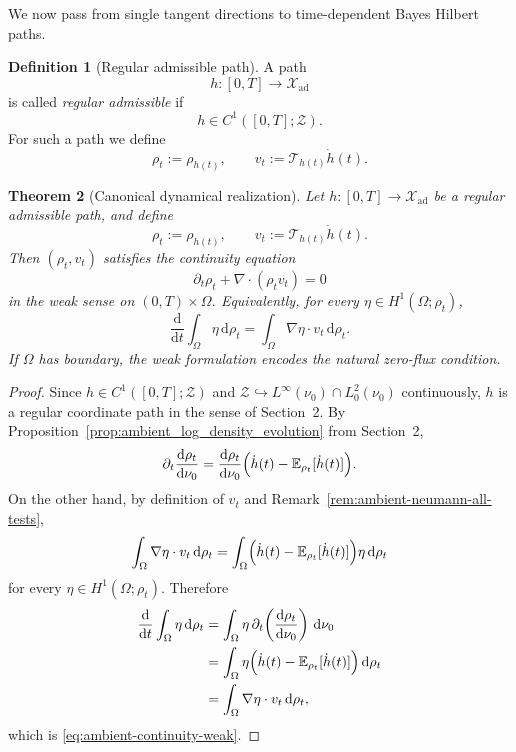 \documentclass{article}
\newtheorem{theorem}{Theorem}[section]
\theoremstyle{definition}
\newtheorem{definition}[theorem]{Definition}
\renewcommand{\d}{\mathrm{d}}
\begin{document}
We now pass from single tangent directions to time-dependent Bayes Hilbert paths.

\begin{definition}[Regular admissible path]
    \label{def:ambient-regular-admissible-path}
    A path
    \[
        h:[0,T]\to \mathcal X_{\mathrm{ad}}
    \]
    is called \emph{regular admissible} if
    \[
        h\in C^1([0,T];\mathcal Z).
    \]
    For such a path we define
    \[
        \rho_t := \rho_{h(t)},
        \qquad
        v_t := \mathcal T_{h(t)}\dot h(t).
    \]
\end{definition}

\begin{theorem}[Canonical dynamical realization]
    \label{thm:ambient-continuity-equation}
    Let \(h:[0,T]\to \mathcal X_{\mathrm{ad}}\) be a regular admissible path, and define
    \[
        \rho_t := \rho_{h(t)},
        \qquad
        v_t := \mathcal T_{h(t)}\dot h(t).
    \]
    Then \((\rho_t,v_t)\) satisfies the continuity equation
    \begin{equation}
        \label{eq:ambient-continuity-equation}
        \partial_t \rho_t + \nabla\cdot(\rho_t v_t)=0
    \end{equation}
    in the weak sense on \((0,T)\times\Omega\). Equivalently, for every
    \(\eta\in H^1(\Omega;\rho_t)\),
    \begin{equation}
        \label{eq:ambient-continuity-weak}
        \frac{\d}{\d t}\int_\Omega \eta\, \d\rho_t
        =
        \int_\Omega \nabla \eta\cdot v_t\, \d\rho_t.
    \end{equation}
    If \(\Omega\) has boundary, the weak formulation encodes the natural zero-flux condition.
\end{theorem}

\begin{proof}
    Since \(h\in C^1([0,T];\mathcal Z)\) and \(\mathcal Z\hookrightarrow L^\infty(\nu_0)\cap
    L^2_0(\nu_0)\) continuously, \(h\) is a regular coordinate path in the sense of Section~2.
    By Proposition~\ref{prop:ambient_log_density_evolution} from Section~2,
    \[
        \partial_t \frac{\d\rho_t}{\d\nu_0}
        =
        \frac{\d\rho_t}{\d\nu_0}
        \Bigl(\dot h(t)-\mathbb E_{\rho_t}[\dot h(t)]\Bigr).
    \]
    On the other hand, by definition of \(v_t\) and
    Remark~\ref{rem:ambient-neumann-all-tests},
    \[
        \int_\Omega \nabla\eta\cdot v_t\,\d\rho_t
        =
        \int_\Omega
        \Bigl(\dot h(t)-\mathbb E_{\rho_t}[\dot h(t)]\Bigr)\eta\,\d\rho_t
    \]
    for every \(\eta\in H^1(\Omega;\rho_t)\). Therefore
    \begin{align*}
        \frac{\d}{\d t}\int_\Omega \eta\,\d\rho_t
         & =
        \int_\Omega \eta\,
        \partial_t\!\left(\frac{\d\rho_t}{\d\nu_0}\right)\,\d\nu_0      \\
         & =
        \int_\Omega
        \eta
        \Bigl(\dot h(t)-\mathbb E_{\rho_t}[\dot h(t)]\Bigr)\,\d\rho_t \\
         & =
        \int_\Omega \nabla\eta\cdot v_t\,\d\rho_t,
    \end{align*}
    which is \eqref{eq:ambient-continuity-weak}.
\end{proof}
\end{document}

